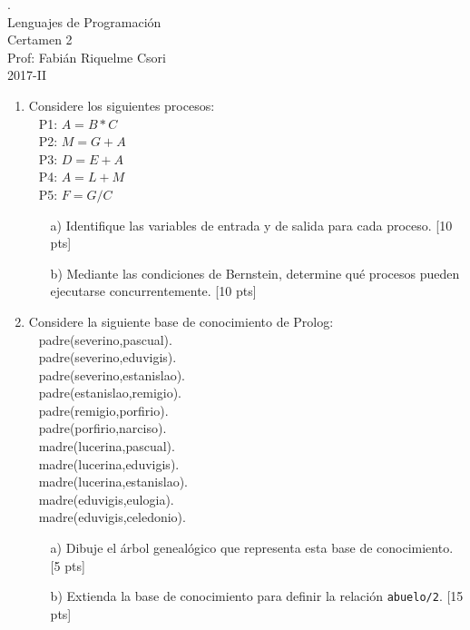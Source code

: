 \documentclass[letter,12pt,oneside]{book}
\theoremstyle{definition}
\begin{document}

\begin{center}
 {\Large
  {\color{white}.}\\[5ex]
  Lenguajes de Programación\\[1ex]
  Certamen 2}\\[1.2ex]
  Prof: Fabián Riquelme Csori\\
  2017-II
\end{center}

\begin{enumerate}
    \item Considere los siguientes procesos:\\
    $~~$ P1: $A = B*C$\\
    $~~$ P2: $M = G+A$\\
    $~~$ P3: $D = E+A$\\
    $~~$ P4: $A = L+M$\\
    $~~$ P5: $F = G/C$
    \begin{enumerate}
        \item[a)] Identifique las variables de entrada y de salida para cada proceso. \tabto{75ex}[10 pts]
        \item[b)] Mediante las condiciones de Bernstein, determine qué procesos pueden ejecutarse concurrentemente. \tabto{75ex}[10 pts]
    \end{enumerate}
    
\item Considere la siguiente base de conocimiento de Prolog:\\
    $~~$ padre(severino,pascual).\\
    $~~$ padre(severino,eduvigis).\\
    $~~$ padre(severino,estanislao).\\
    $~~$ padre(estanislao,remigio).\\
    $~~$ padre(remigio,porfirio).\\
    $~~$ padre(porfirio,narciso).\\
    $~~$ madre(lucerina,pascual).\\
    $~~$ madre(lucerina,eduvigis).\\
    $~~$ madre(lucerina,estanislao).\\
    $~~$ madre(eduvigis,eulogia).\\
    $~~$ madre(eduvigis,celedonio).
    \begin{enumerate}
        \item[a)] Dibuje el árbol genealógico que representa esta base de conocimiento. \tabto{76ex}[5 pts]
        \item[b)] Extienda la base de conocimiento para definir la relación \texttt{abuelo/2}. \tabto{75ex}[15 pts]
    \end{enumerate}


\end{enumerate}
\end{document}
